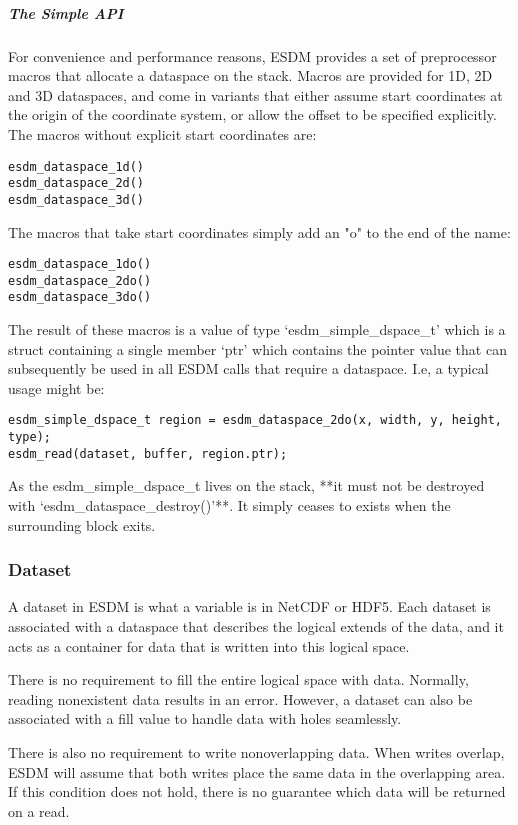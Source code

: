 \subparagraph{The Simple API}

For convenience and performance reasons, ESDM provides a set of
preprocessor macros that allocate a dataspace on the stack. Macros are
provided for 1D, 2D and 3D dataspaces, and come in variants that either
assume start coordinates at the origin of the coordinate system, or
allow the offset to be specified explicitly. The macros without explicit
start coordinates are:

\begin{lstlisting}
esdm_dataspace_1d()
esdm_dataspace_2d()
esdm_dataspace_3d()
\end{lstlisting}

The macros that take start coordinates simply add an "o" to the end of
the name:

\begin{lstlisting}
esdm_dataspace_1do()
esdm_dataspace_2do()
esdm_dataspace_3do()
\end{lstlisting}

The result of these macros is a value of type `esdm\_simple\_dspace\_t'
which is a struct containing a single member `ptr' which contains the
pointer value that can subsequently be used in all ESDM calls that
require a dataspace. I.e, a typical usage might be:

\begin{lstlisting}
esdm_simple_dspace_t region = esdm_dataspace_2do(x, width, y, height, type);
esdm_read(dataset, buffer, region.ptr);
\end{lstlisting}

As the esdm\_simple\_dspace\_t lives on the stack, **it must not be
destroyed with `esdm\_dataspace\_destroy()'**. It simply ceases to
exists when the surrounding block exits.

\subsubsection{Dataset}

A dataset in ESDM is what a variable is in NetCDF or HDF5. Each dataset
is associated with a dataspace that describes the logical extends of the
data, and it acts as a container for data that is written into this
logical space.

There is no requirement to fill the entire logical space with data.
Normally, reading nonexistent data results in an error. However, a
dataset can also be associated with a fill value to handle data with
holes seamlessly.

There is also no requirement to write nonoverlapping data. When writes
overlap, ESDM will assume that both writes place the same data in the
overlapping area. If this condition does not hold, there is no guarantee
which data will be returned on a read.

